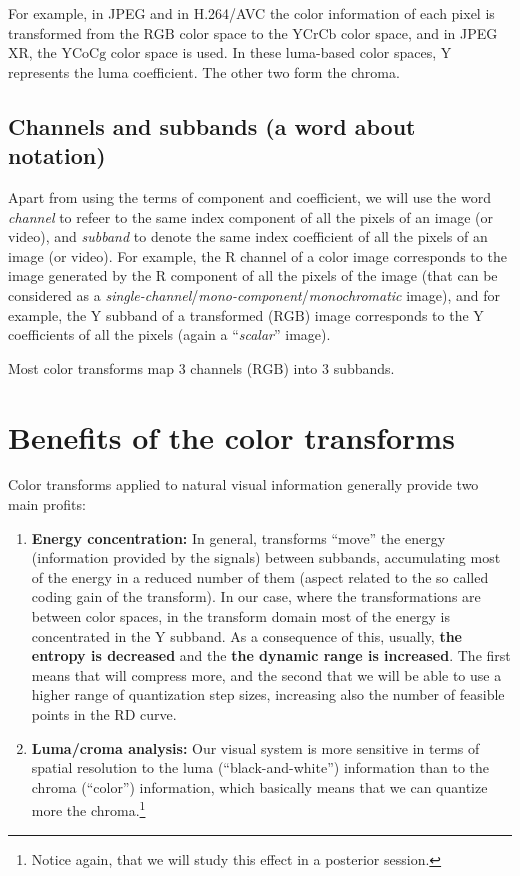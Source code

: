 For example, in JPEG and in H.264/AVC the color information of each
pixel is transformed from the $\text{RGB}$ color space to the
$\text{YCrCb}$ color space, and in JPEG XR, the $\text{YCoCg}$ color
space is used. In these luma-based color spaces, $\text{Y}$ represents
the luma coefficient. The other two form the chroma.

\subsection*{Channels and subbands (a word about notation)}

Apart from using the terms of component and coefficient, we will use
the word \emph{channel} to refeer to the same index component of all
the pixels of an image (or video), and \emph{subband} to denote the
same index coefficient of all the pixels of an image (or video). For
example, the $\text{R}$ channel of a color image corresponds to the
image generated by the $\text{R}$ component of all the pixels of the
image (that can be considered as a
\emph{single-channel}/\emph{mono-component}/\emph{monochromatic}
image), and for example, the $\text{Y}$ subband of a transformed
($\text{RGB}$) image corresponds to the $\text{Y}$ coefficients of
all the pixels (again a ``\emph{scalar}'' image).

Most color transforms map 3 channels ($\text{RGB}$) into 3 subbands.

\section{Benefits of the color transforms}

Color transforms applied to natural visual information generally
provide two main profits:
\begin{enumerate}
\item \textbf{Energy concentration:} In general, transforms ``move''
  the energy (information provided by the signals) between subbands,
  accumulating most of the energy in a reduced number of them (aspect
  related to the so called coding gain of the transform). In our case,
  where the transformations are between color spaces, in the transform
  domain most of the energy is concentrated in the $\text{Y}$
  subband. As a consequence of this, usually, \textbf{the entropy is
    decreased} and the \textbf{the dynamic range is increased}. The
  first means that will compress more, and the second that we will be
  able to use a higher range of quantization step sizes, increasing
  also the number of feasible points in the RD curve.
\item \textbf{Luma/croma analysis:} Our visual system is more
  sensitive in terms of spatial resolution to the luma
  (``black-and-white'') information than to the chroma (``color'')
  information, which basically means that we can quantize more the
  chroma.\footnote{Notice again, that we will study this effect in a
  posterior session.}
\end{enumerate}

